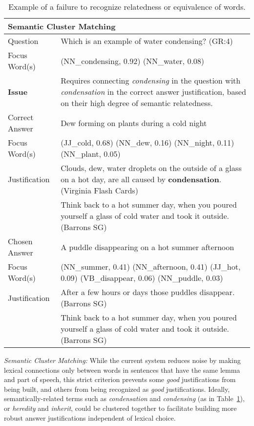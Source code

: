 \begin{table}[]
\begin{footnotesize}
\begin{tabularx}{\textwidth}{p{2.5cm}p{10cm}}
\hline
\multicolumn{2}{l}{Semantic Cluster Matching} \\
\hline
Question & Which is an example of water condensing? (GR:4)   \\
Focus Word(s) &  (NN\_condensing, 0.92) (NN\_water, 0.08) \\
\textbf{Issue}		& Requires connecting \emph{condensing} in the question with \emph{condensation} in the correct answer justification, based on their high degree of semantic relatedness. \\
\hline
Correct Answer &  Dew forming on plants during a cold night \\
Focus Word(s) &  (JJ\_cold, 0.68) (NN\_dew, 0.16) (NN\_night, 0.11) (NN\_plant, 0.05) \\
Justification 	& Clouds, dew, water droplets on the outside of a glass on a hot day, are all caused by {\bf condensation}. (Virginia Flash Cards) \\
 				& Think back to a hot summer day, when you poured yourself a glass of cold water and took it outside.  (Barrons SG) \\
\hline
Chosen Answer & A puddle disappearing on a hot summer afternoon \\
Focus Word(s) &  (NN\_summer, 0.41) (NN\_afternoon, 0.41) (JJ\_hot, 0.09) (VB\_disappear, 0.06) (NN\_puddle, 0.03) \\
Justification 	& After a few hours or days those puddles disappear. (Barrons SG) \\
			 	& Think back to a hot summer day, when you poured yourself a glass of cold water and took it outside.  (Barrons SG) \\
\hline
\end{tabularx}
\end{footnotesize}
\caption{{  Example of a failure to recognize relatedness or equivalence of words. }} 
\label{ex:clustermatching}

\end{table}


{}

{\flushleft \emph{Semantic Cluster Matching: }}
While the current system reduces noise by making lexical connections only between words in sentences that have the same lemma and part of speech, this strict criterion prevents some \emph{good} justifications from being built, and others from being recognized as \emph{good} justifications.  Ideally, semantically-related terms such as \emph{condensation} and \emph{condensing} (as in Table~\ref{ex:clustermatching}), or \emph{heredity} and \emph{inherit}, could be clustered together to facilitate building more robust answer justifications independent of lexical choice. 

